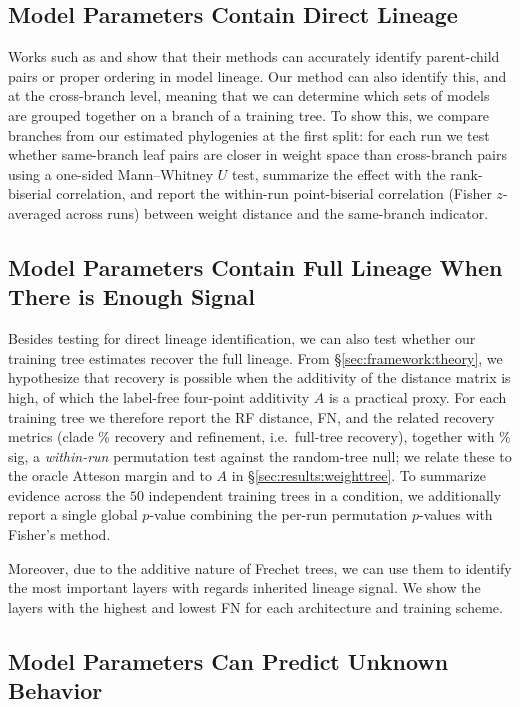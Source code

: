 \documentclass{article}
\theoremstyle{definition}
\theoremstyle{plain}
\begin{document}
\subsection{Model Parameters Contain Direct Lineage}
Works such as \cite{horwitz2024mother} and \cite{yu2025neural} show that their methods can accurately identify parent-child pairs or proper ordering in model lineage.  Our method can also identify this, and at the cross-branch level, meaning that we can determine which sets of models are grouped together on a branch of a training tree.  To show this, we compare branches from our estimated phylogenies at the first split: for each run we test whether same-branch leaf pairs are closer in weight space than cross-branch pairs using a one-sided Mann--Whitney $U$ test, summarize the effect with the rank-biserial correlation, and report the within-run point-biserial correlation (Fisher $z$-averaged across runs) between weight distance and the same-branch indicator.

\subsection{Model Parameters Contain Full Lineage When There is Enough Signal}
\label{sec:exp:weights}

Besides testing for direct lineage identification, we can also test whether our training tree estimates recover the full lineage.  From \S \ref{sec:framework:theory}, we hypothesize that recovery is possible when the additivity of the distance matrix is high, of which the label-free four-point additivity $A$ is a practical proxy.  For each training tree we therefore report the RF distance, FN, and the related recovery metrics (clade \% recovery and refinement, i.e.\ full-tree recovery), together with \% sig, a \textit{within-run} permutation test against the random-tree null; we relate these to the oracle Atteson margin and to $A$ in \S\ref{sec:results:weighttree}.  To summarize evidence across the $50$ independent training trees in a condition, we additionally report a single global $p$-value combining the per-run permutation $p$-values with Fisher's method.

Moreover, due to the additive nature of Frechet trees, we can use them to identify the most important layers with regards inherited lineage signal.  We show the layers with the highest and lowest FN for each architecture and training scheme.


\subsection{Model Parameters Can Predict Unknown Behavior}
\label{sec:exp:behavioral}
\end{document}
